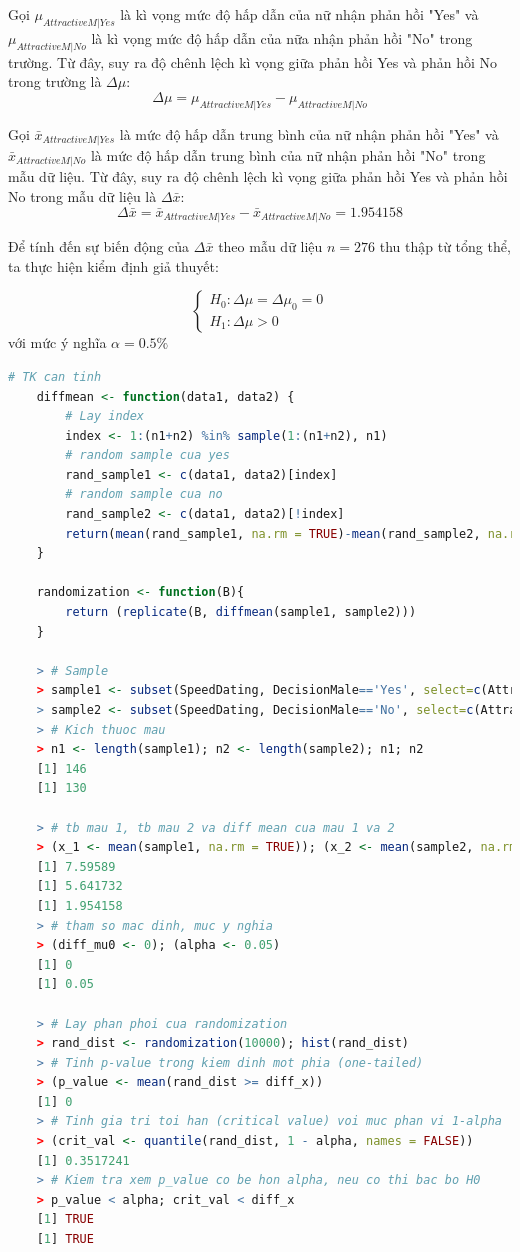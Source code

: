 \documentclass[a4paper,12pt]{article}
\begin{document}
	Gọi $\mu_{AttractiveM|Yes}$ là kì vọng mức độ hấp dẫn của nữ nhận phản hồi "Yes" và $\mu_{AttractiveM|No}$ là kì vọng mức độ hấp dẫn của nữa nhận phản hồi "No" trong trường. Từ đây, suy ra độ chênh lệch kì vọng giữa phản hồi Yes và phản hồi No trong trường là $\Delta\mu$:
	$$\Delta\mu = \mu_{AttractiveM|Yes} - \mu_{AttractiveM|No}$$
	
	Gọi $\bar{x}_{AttractiveM|Yes}$ là mức độ hấp dẫn trung bình của nữ nhận phản hồi "Yes" và $\bar{x}_{AttractiveM|No}$ là mức độ hấp dẫn trung bình của nữ nhận phản hồi "No" trong mẫu dữ liệu. Từ đây, suy ra độ chênh lệch kì vọng giữa phản hồi Yes và phản hồi No trong mẫu dữ liệu là $\Delta\bar{x}$:
	$$\Delta\bar{x} = \bar{x}_{AttractiveM|Yes} - \bar{x}_{AttractiveM|No} = 1.954158$$
	
	Để tính đến sự biến động của $\Delta\bar{x}$ theo mẫu dữ liệu $n = 276$ thu thập từ tổng thể, ta thực hiện kiểm định giả thuyết:
	
	\begin{equation*}
	\begin{cases}
	H_0: \Delta\mu = \Delta\mu_0 = 0\\
	H_1: \Delta\mu > 0
	\end{cases}
	\end{equation*}
	với mức ý nghĩa $\alpha = 0.5\%$
	
	\begin{lstlisting}[language=R]
	# TK can tinh
	diffmean <- function(data1, data2) {
		# Lay index
		index <- 1:(n1+n2) %in% sample(1:(n1+n2), n1)
		# random sample cua yes
		rand_sample1 <- c(data1, data2)[index]
		# random sample cua no
		rand_sample2 <- c(data1, data2)[!index]
		return(mean(rand_sample1, na.rm = TRUE)-mean(rand_sample2, na.rm = TRUE))
	}
	
	randomization <- function(B){
		return (replicate(B, diffmean(sample1, sample2)))
	}
	
	> # Sample
	> sample1 <- subset(SpeedDating, DecisionMale=='Yes', select=c(AttractiveM))[[1]]; 
	> sample2 <- subset(SpeedDating, DecisionMale=='No', select=c(AttractiveM))[[1]];
	> # Kich thuoc mau
	> n1 <- length(sample1); n2 <- length(sample2); n1; n2
	[1] 146
	[1] 130
	 
	> # tb mau 1, tb mau 2 va diff mean cua mau 1 va 2
	> (x_1 <- mean(sample1, na.rm = TRUE)); (x_2 <- mean(sample2, na.rm = TRUE)); (diff_x <- x_1 - x_2)
	[1] 7.59589
	[1] 5.641732
	[1] 1.954158
	> # tham so mac dinh, muc y nghia
	> (diff_mu0 <- 0); (alpha <- 0.05)
	[1] 0
	[1] 0.05
	
	> # Lay phan phoi cua randomization
	> rand_dist <- randomization(10000); hist(rand_dist)
	> # Tinh p-value trong kiem dinh mot phia (one-tailed)
	> (p_value <- mean(rand_dist >= diff_x))
	[1] 0
	> # Tinh gia tri toi han (critical value) voi muc phan vi 1-alpha
	> (crit_val <- quantile(rand_dist, 1 - alpha, names = FALSE))
	[1] 0.3517241
	> # Kiem tra xem p_value co be hon alpha, neu co thi bac bo H0
	> p_value < alpha; crit_val < diff_x
	[1] TRUE
	[1] TRUE
	\end{lstlisting}
	
\end{document}
